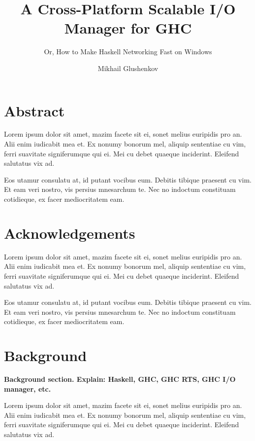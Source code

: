 \documentclass[a4paper,11pt,oneside]{report}
\title{A Cross-Platform Scalable I/O Manager for GHC}
\subtitle{Or, How to Make Haskell Networking Fast on Windows}
\author{Mikhail Glushenkov}
\begin{document}
\maketitle

\chapter*{Abstract}
Lorem ipsum dolor sit amet, mazim facete sit ei, sonet melius euripidis pro
an. Alii enim iudicabit mea et. Ex nonumy bonorum mel, aliquip sententiae cu
vim, ferri suavitate signiferumque qui ei. Mei cu debet quaeque
inciderint. Eleifend salutatus vix ad.

Eos utamur consulatu at, id putant vocibus eum. Debitis tibique praesent cu
vim. Et eam veri nostro, vis persius mnesarchum te. Nec no indoctum constituam
cotidieque, ex facer mediocritatem eam.

\pagebreak

\chapter*{Acknowledgements}

Lorem ipsum dolor sit amet, mazim facete sit ei, sonet melius euripidis pro
an. Alii enim iudicabit mea et. Ex nonumy bonorum mel, aliquip sententiae cu
vim, ferri suavitate signiferumque qui ei. Mei cu debet quaeque
inciderint. Eleifend salutatus vix ad.

Eos utamur consulatu at, id putant vocibus eum. Debitis tibique praesent cu
vim. Et eam veri nostro, vis persius mnesarchum te. Nec no indoctum constituam
cotidieque, ex facer mediocritatem eam.

\pagebreak


\tableofcontents

\pagebreak

\pagestyle{fancy}
\setcounter{page}{1}

\chapter{Background}

\textbf{Background section. Explain: Haskell, GHC, GHC RTS, GHC I/O manager,
  etc.}

Lorem ipsum dolor sit amet, mazim facete sit ei, sonet melius euripidis pro
an. Alii enim iudicabit mea et. Ex nonumy bonorum mel, aliquip sententiae cu
vim, ferri suavitate signiferumque qui ei. Mei cu debet quaeque
inciderint. Eleifend salutatus vix ad.
\end{document}
